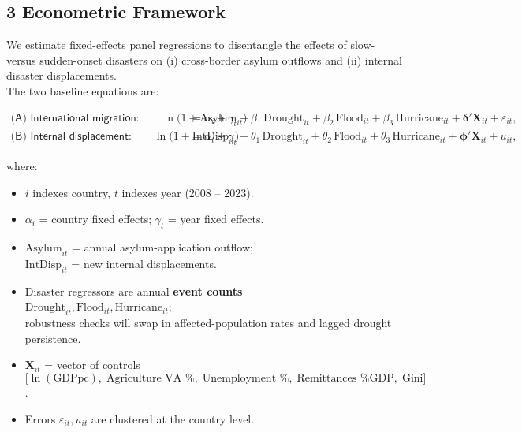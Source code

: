 \documentclass[
  11pt,
]{article}
\providecommand{\tightlist}{%
  \setlength{\itemsep}{0pt}\setlength{\parskip}{0pt}}
\begin{document}
\subsection{3 Econometric Framework}\label{econometric-framework}

We estimate fixed-effects panel regressions to disentangle the effects
of slow- versus sudden-onset disasters on (i) cross-border asylum
outflows and (ii) internal disaster displacements.\\
The two baseline equations are:

\[
\begin{aligned}
\textsf{(A) International migration:}\qquad
\ln\!\bigl(1+\text{Asylum}_{it}\bigr)
      &= \alpha_i + \gamma_t
      + \beta_1\,\text{Drought}_{it}
      + \beta_2\,\text{Flood}_{it}
      + \beta_3\,\text{Hurricane}_{it}
      + \mathbf{\delta}'\mathbf X_{it}
      + \varepsilon_{it},\\[6pt]
\textsf{(B) Internal displacement:}\qquad
\ln\!\bigl(1+\text{IntDisp}_{it}\bigr)
      &= \alpha_i + \gamma_t
      + \theta_1\,\text{Drought}_{it}
      + \theta_2\,\text{Flood}_{it}
      + \theta_3\,\text{Hurricane}_{it}
      + \mathbf{\phi}'\mathbf X_{it}
      + u_{it},
\end{aligned}
\]

where:

\begin{itemize}
\tightlist
\item
  \(i\) indexes country, \(t\) indexes year (2008 -- 2023).\\
\item
  \(\alpha_i\) = country fixed effects; \(\gamma_t\) = year fixed
  effects.\\
\item
  \(\text{Asylum}_{it}\) = annual asylum-application outflow;\\
  \(\text{IntDisp}_{it}\) = new internal displacements.\\
\item
  Disaster regressors are annual \textbf{event counts}\\
  \(\text{Drought}_{it}, \text{Flood}_{it}, \text{Hurricane}_{it}\);\\
  robustness checks will swap in affected-population rates and lagged
  drought persistence.\\
\item
  \(\mathbf X_{it}\) = vector of controls\\
  \(\bigl[\ln(\text{GDPpc}),\; \text{Agriculture VA \%},\; \text{Unemployment \%},\; \text{Remittances \% GDP},\; \text{Gini} \bigr]\).\\
\item
  Errors \(\varepsilon_{it}, u_{it}\) are clustered at the country
  level.
\end{itemize}
\end{document}
